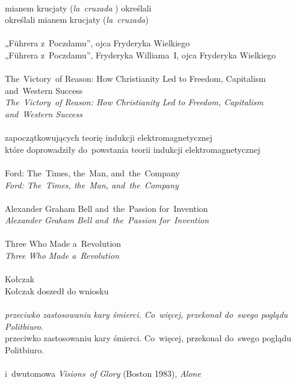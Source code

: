 \documentclass[a4paper,11pt]{article}
\begin{document}
\noindent
{} \\
\Jest  mianem krucjaty (\textit{la~cruzada} ) określali \\
\Powin określali mianem krucjaty (\textit{la~cruzada}) \\
 \\
\Jest  „F\"{u}hrera z~Poczdamu”, ojca Fryderyka Wielkiego \\
\Powin „F\"{u}hrera z~Poczdamu”, Fryderyka Williama~I, ojca Fryderyka
Wielkiego \\
 \\
\Jest  The~Victory~of Reason: How Christianity Led to Freedom,
Capitalism and~Western Success \\
\Powin \textit{The~Victory~of Reason: How Christianity Led to Freedom,
  Capitalism and~Western Success} \\
 \\
\Jest  zapoczątkowujących teorię indukcji elektromagnetycznej \\
\Powin które doprowadziły do~powstania teorii indukcji
elektromagnetycznej \\
 \\
\Jest  Ford: The~Times, the~Man, and~the~Company \\
\Powin \textit{Ford: The~Times, the~Man, and~the~Company} \\
 \\
\Jest  Alexander Graham Bell and~the~Passion for~Invention \\
\Powin \textit{Alexander Graham Bell and~the~Passion for~Invention} \\
 \\
\Jest  Three Who Made a~Revolution \\
\Powin \textit{Three Who Made a~Revolution} \\
 \\
\Jest  Kołczak \\
\Powin Kołczak doszedł do wniosku \\
 \\
\Jest \textit{przeciwko zastosowaniu kary śmierci. Co~więcej,
  przekonał do~swego poglądu Politbiuro.} \\
\Powin przeciwko zastosowaniu kary śmierci. Co~więcej, przekonał
do~swego poglądu Politbiuro. \\
 \\
\Jest  i~dwutomowa \textit{Visions~of Glory} (Boston 1983),
\textit{Alone} \\
\end{document}
